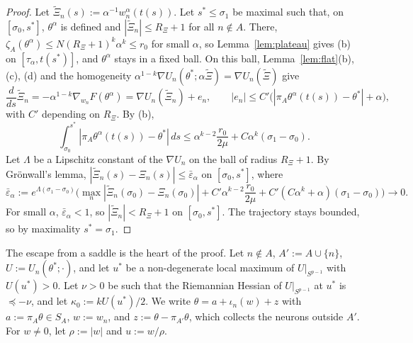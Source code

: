 \documentclass[11pt]{article}
\theoremstyle{definition}
\theoremstyle{remark}
\numberwithin{equation}{section}
\newcommand{\eps}{\varepsilon}
\begin{document}
\begin{proof}
Let $\tilde\Xi_n(s):=\alpha^{-1}w^\alpha_n(t(s))$. Let $s^*\le\sigma_1$ be maximal such that, on $[\sigma_0,s^*]$, $\theta^\alpha$ is defined and $|\tilde\Xi_n|\le R_\Xi+1$ for all $n\notin A$. There, $\zeta_A(\theta^\alpha)\le N(R_\Xi+1)^k\alpha^k\le r_0$ for small $\alpha$, so Lemma~\ref{lem:plateau} gives (b) on $[\tau_\alpha,t(s^*)]$, and $\theta^\alpha$ stays in a fixed ball. On this ball, Lemma~\ref{lem:flat}(b), (c), (d) and the homogeneity $\alpha^{1-k}\nabla U_n(\theta^*;\alpha\tilde\Xi)=\nabla U_n(\tilde\Xi)$ give
\[
\frac{d}{ds}\tilde\Xi_n=-\alpha^{1-k}\nabla_{w_n}F(\theta^\alpha)=\nabla U_n(\tilde\Xi_n)+e_n,\qquad |e_n|\le C'\big(|\pi_A\theta^\alpha(t(s))-\theta^*|+\alpha\big),
\]
with $C'$ depending on $R_\Xi$. By (b),
\[
\int_{\sigma_0}^{s^*}|\pi_A\theta^\alpha(t(s))-\theta^*|\,ds\le\alpha^{k-2}\frac{r_0}{2\mu}+C\alpha^k(\sigma_1-\sigma_0).
\]
Let $\Lambda$ be a Lipschitz constant of the $\nabla U_n$ on the ball of radius $R_\Xi+1$. By Grönwall's lemma, $|\tilde\Xi_n(s)-\Xi_n(s)|\le\bar\eps_\alpha$ on $[\sigma_0,s^*]$, where
\[
\bar\eps_\alpha:=e^{\Lambda(\sigma_1-\sigma_0)}\Big(\max_n|\tilde\Xi_n(\sigma_0)-\Xi_n(\sigma_0)|+C'\alpha^{k-2}\frac{r_0}{2\mu}+C'(C\alpha^k+\alpha)(\sigma_1-\sigma_0)\Big)\to0.
\]
For small $\alpha$, $\bar\eps_\alpha<1$, so $|\tilde\Xi_n|<R_\Xi+1$ on $[\sigma_0,s^*]$. The trajectory stays bounded, so by maximality $s^*=\sigma_1$.
\end{proof}

The escape from a saddle is the heart of the proof. Let $n\notin A$, $A':=A\cup\{n\}$, $U:=U_n(\theta^*;\cdot)$, and let $u^*$ be a non-degenerate local maximum of $U|_{S^{p-1}}$ with $U(u^*)>0$. Let $\nu>0$ be such that the Riemannian Hessian of $U|_{S^{p-1}}$ at $u^*$ is $\preceq-\nu$, and let $\kappa_0:=kU(u^*)/2$. We write $\theta=a+\iota_n(w)+z$ with $a:=\pi_A\theta\in S_A$, $w:=w_n$, and $z:=\theta-\pi_{A'}\theta$, which collects the neurons outside $A'$. For $w\neq0$, let $\rho:=|w|$ and $u:=w/\rho$.
\end{document}
